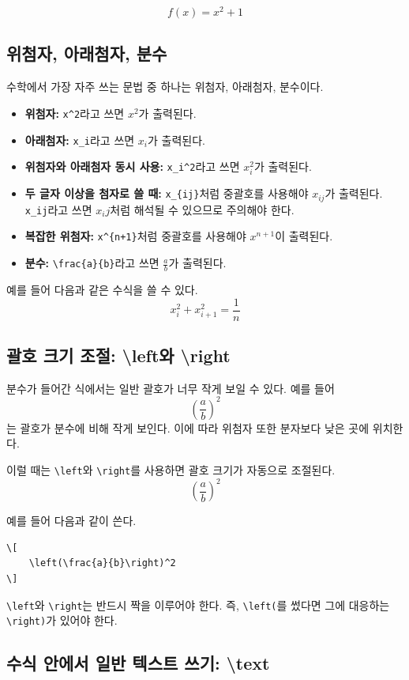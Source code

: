 \documentclass[11pt, a4paper]{article}
\theoremstyle{plain}
\theoremstyle{definition}
\theoremstyle{remark}
\begin{document}
\[
    f(x) = x^2 + 1
\]

\subsection{위첨자, 아래첨자, 분수}

수학에서 가장 자주 쓰는 문법 중 하나는 위첨자, 아래첨자, 분수이다.

\begin{itemize}
    \item \textbf{위첨자:} \verb|x^2|라고 쓰면 $x^2$가 출력된다.
    \item \textbf{아래첨자:} \verb|x_i|라고 쓰면 $x_i$가 출력된다.
    \item \textbf{위첨자와 아래첨자 동시 사용:} \verb|x_i^2|라고 쓰면 $x_i^2$가 출력된다.
    \item \textbf{두 글자 이상을 첨자로 쓸 때:}
    \verb|x_{ij}|처럼 중괄호를 사용해야 $x_{ij}$가 출력된다.
    \verb|x_ij|라고 쓰면 $x_i j$처럼 해석될 수 있으므로 주의해야 한다.
    \item \textbf{복잡한 위첨자:}
    \verb|x^{n+1}|처럼 중괄호를 사용해야 $x^{n+1}$이 출력된다.
    \item \textbf{분수:}
    \verb|\frac{a}{b}|라고 쓰면 $\frac{a}{b}$가 출력된다.
\end{itemize}

예를 들어 다음과 같은 수식을 쓸 수 있다.
\[
    x_i^2 + x_{i+1}^2 = \frac{1}{n}
\]

\subsection{괄호 크기 조절: \textbackslash left와 \textbackslash right}

분수가 들어간 식에서는 일반 괄호가 너무 작게 보일 수 있다.
예를 들어
\[
    (\frac{a}{b})^2
\]
는 괄호가 분수에 비해 작게 보인다. 이에 따라 위첨자 또한 분자보다 낮은 곳에 위치한다.

이럴 때는 \verb|\left|와 \verb|\right|를 사용하면 괄호 크기가 자동으로 조절된다.
\[
    \left(\frac{a}{b}\right)^2
\]

예를 들어 다음과 같이 쓴다.
\begin{verbatim}
\[
    \left(\frac{a}{b}\right)^2
\]
\end{verbatim}

\verb|\left|와 \verb|\right|는 반드시 짝을 이루어야 한다. 즉, \verb|\left(|를 썼다면 그에 대응하는 \verb|\right)|가 있어야 한다.

\subsection{수식 안에서 일반 텍스트 쓰기: \textbackslash text}
\end{document}
